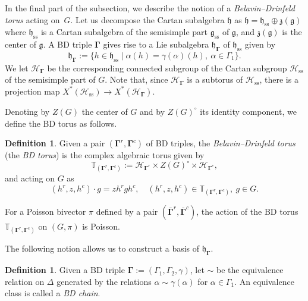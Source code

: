 \documentclass[11pt]{article}
\newcommand{\bbg}{\bar{\mathbf{\Gamma}}}
\newcommand{\bg}{\mathbf{\Gamma}}
\DeclareMathOperator{\ses}{ss}
\theoremstyle{definition}\newtheorem{definition}[theorem]{Definition}
\theoremstyle{definition}\newtheorem{remark}[theorem]{Remark}
\theoremstyle{remark}
\numberwithin{equation}{section}
\begin{document}
In the final part of the subsection, we describe the notion of a \emph{Belavin--Drinfeld torus} acting on~$G$. Let us decompose the Cartan subalgebra $\mathfrak{h}$ as $\mathfrak{h} = \mathfrak{h}_{\ses} \oplus \mathfrak{z}(\mathfrak{g})$ where $\mathfrak{h}_{\ses}$ is a Cartan subalgebra of the semisimple part $\mathfrak{g}_{\ses}$ of $\mathfrak{g}$, and $\mathfrak{z}(\mathfrak{g})$ is the center of $\mathfrak{g}$. A BD triple $\bg$ gives rise to a Lie subalgebra $\mathfrak{h}_{\bg}$ of $\mathfrak{h}_{\ses}$ given by
\begin{equation*}
    \mathfrak{h}_{\bg}:=\{h \in \mathfrak{h}_{\ses}\mid \alpha(h) = \gamma(\alpha)(h), \ \alpha \in \Gamma_1\}.
\end{equation*}
We let $\mathcal{H}_{\bg}$ be the corresponding connected subgroup of the Cartan subgroup $\mathcal{H}_{\ses}$ of the semisimple part of $G$.
Note that, since $\mathcal{H}_{\bg}$ is a subtorus of $\mathcal{H}_{\ses}$, there is a projection map $X^*(\mathcal{H}_{\ses}) \rightarrow X^*(\mathcal{H}_{\bg})$.

Denoting by $Z(G)$ the center of $G$ and by $Z(G)^{\circ}$ its identity component, we define the BD torus as follows.
\begin{definition}
    Given a pair $(\bg^r,\bg^c)$ of BD triples, the \emph{Belavin--Drinfeld torus} (the \emph{BD torus}) is the complex algebraic torus given by
    \begin{equation*}
        \mathbb{T}_{(\bg^r,\bg^c)}:= \mathcal{H}_{\bg^r} \times Z(G)^{\circ} \times \mathcal{H}_{\bg^c},
    \end{equation*}
    and acting on $G$ as
    \begin{equation*}
        (h^r,z,h^c)\cdot g = z h^rgh^c, \quad (h^r,z,h^c) \in \mathbb{T}_{(\bg^r,\bg^c)}, \ g \in G.
    \end{equation*}
\end{definition}
For a Poisson bivector $\pi$ defined by a pair $(\bbg^r,\bbg^c)$, the action of the BD torus $\mathbb{T}_{(\bg^r,\bg^c)}$ on $(G,\pi)$ is Poisson.

The following notion allows us to construct
a basis of $\mathfrak{h}_{\bg}$.
\begin{definition}\label{d:bd_chain}
    Given a BD triple $\bg:=(\Gamma_1,\Gamma_2,\gamma)$, let $\sim$ be the equivalence relation on $\Delta$ generated by the relations $\alpha\sim\gamma(\alpha)$ for $\alpha\in\Gamma_1$. An equivalence class is called a \emph{BD chain}.
\end{definition}
\end{document}
